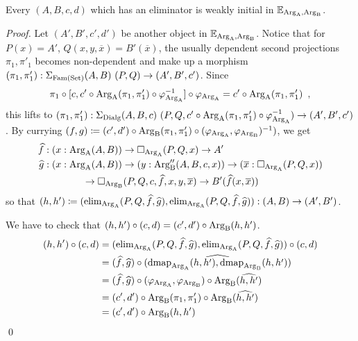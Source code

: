 \documentclass[orivec,envcountsame, ,envcountsect]{llncs}
\begin{document}
\begin{proposition}
\label{thm:elim-to-weak-init}
  Every $(A, B, c, d)$ which has an eliminator is weakly initial in $\mathbb{E}_{\text{Arg}_{\text{A}}, \text{Arg}_{\text{B}}}$.
\end{proposition}
\begin{proof}
  Let $(A', B', c', d')$ be another object in
  $\mathbb{E}_{\text{Arg}_{\text{A}}, \text{Arg}_{\text{B}}}$. Notice that for $P(x) = A'$, $Q(x, y,
  \overline{x}) = B'(\overline{x})$, the usually dependent second
  projections $\pi_1, \pi'_1$ becomes non-dependent and make up a
  morphism $(\pi_1, \pi'_1) : \Sigma_{\text{Fam}(\text{Set})} (A, B)\ (P, Q) \to (A', B',
  c')$. 
  Since
   \[
   \pi_1 \circ [c, c' \circ \text{Arg}_{\text{A}}(\pi_1, \pi'_1) \circ \varphi_{\text{Arg}_{\text{A}}}^{-1}]
         \circ \varphi_{\text{Arg}_{\text{A}}} = c' \circ \text{Arg}_{\text{A}}(\pi_1, \pi'_1) \enspace ,
   \]
   this lifts to $(\pi_1, \pi'_1) : \Sigma_{\text{Dialg}} (A, B, c)\ (P, Q, c'
   \circ \text{Arg}_{\text{A}}(\pi_1, \pi'_1) \circ \varphi_{\text{Arg}_{\text{A}}}^{-1}) \to (A', B',
   c')$. By currying $(f, g) \coloneqq (c', d') \circ \text{Arg}_{\text{B}}(\pi_1,
   \pi'_1) \circ (\varphi_{\text{Arg}_{\text{A}}}, \varphi_{\text{Arg}_{\text{B}}})^{-1})$, we get
   \begin{align*} %
     \widehat{f} &: (x : \ArgA(A, B)) \to \BOX_{\ArgA}(P, Q, x) \to A' \\ 
     \widehat{g} &: (x : \ArgA(A, B)) \to (y : \ArgB''(A, B, c, x))
     \to
     (\overline{x} : \BOX_{\ArgA}(P, Q, x))  \\
     & \qquad\qquad \to \BOX_{\ArgB}(P, Q, c, \widehat{f}, x, y,
     \overline{x}) \to B'(\widehat{f}(x, \overline{x}))
   \end{align*}
   so that $(h, h') \coloneqq (\text{elim}_{\text{Arg}_{\text{A}}}(P, Q, \widehat{f}, \widehat{g}),
   \text{elim}_{\text{Arg}_{\text{A}}}(P, Q, \widehat{f}, \widehat{g})) : (A, B) \to (A',
   B')$.

   We have to check that $(h, h') \circ (c, d) = (c', d') \circ \text{Arg}_{\text{B}}(h, h')$.
   \begin{align*}
     (h, h') \circ (c, d)
     &= (\text{elim}_{\text{Arg}_{\text{A}}}(P, Q, \widehat{f}, \widehat{g}),
          \text{elim}_{\text{Arg}_{\text{A}}}(P, Q, \widehat{f}, \widehat{g})) \circ (c, d) \\
     &= (\widehat{f}, \widehat{g}) \circ \widehat{(\text{dmap}_{\text{Arg}_{\text{A}}}(h, h'), \text{dmap}_{\text{Arg}_{\text{B}}}(h, h'))} \\
     &= (\widehat{f}, \widehat{g}) \circ (\varphi_{\text{Arg}_{\text{A}}}, \varphi_{\text{Arg}_{\text{B}}}) \circ \text{Arg}_{\text{B}}(\widehat{h, h'}) \\
     &= (c', d') \circ \text{Arg}_{\text{B}}(\pi_1, \pi'_1) \circ \text{Arg}_{\text{B}}(\widehat{h, h'}) \\
     &= (c', d') \circ \text{Arg}_{\text{B}}(h, h')
   \end{align*}
\mbox{} \qed %
\end{proof}
\end{document}
